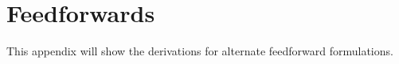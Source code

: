 
\chapter{Feedforwards}

This appendix will show the derivations for alternate feedforward formulations.

\renewcommand*{\chapterpath}{\partpath/feedforwards}


